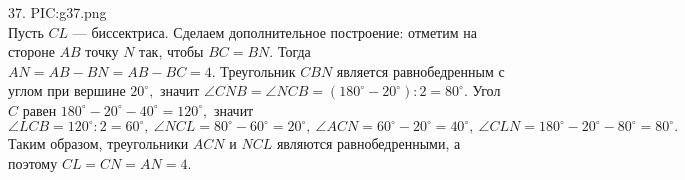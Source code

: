 37. {{PIC:g37.png}}\\
Пусть $CL$ --- биссектриса. Сделаем дополнительное построение: отметим на стороне $AB$ точку $N$ так, чтобы $BC=BN.$ Тогда $AN=AB-BN=AB-BC=4.$ Треугольник $CBN$ является равнобедренным с углом при вершине $20^\circ,$ значит $\angle CNB=\angle NCB=(180^\circ-20^\circ):2=80^\circ.$ Угол $C$ равен $180^\circ-20^\circ-40^\circ=120^\circ,$ значит $\angle LCB=120^\circ:2=60^\circ,\ \angle NCL=80^\circ-60^\circ=20^\circ,\ \angle ACN=60^\circ-20^\circ=40^\circ,\ \angle CLN=180^\circ-20^\circ-80^\circ=80^\circ.$ Таким образом, треугольники $ACN$ и $NCL$ являются равнобедренными, а поэтому $CL=CN=AN=4.$\\
